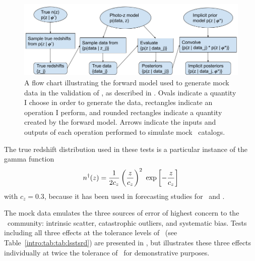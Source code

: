 \begin{figure}
	\begin{center}
		\includegraphics[width=\textwidth]{figures/chippr/flowchart.png}
		\caption{A flow chart illustrating the forward model used to generate mock data in the validation of \Chippr, as described in .
		Ovals indicate a quantity I choose in order to generate the data, rectangles indicate an operation I perform, and rounded rectangles indicate a quantity created by the forward model.
		Arrows indicate the inputs and outputs of each operation performed to simulate mock \pzpdf\ catalogs.}
	\end{center}
\end{figure}

The true redshift distribution used in these tests is a particular instance of the gamma function
\begin{equation}
\eqlabel{eqn:gamma}
n^{\dagger}(z) = \frac{1}{2 c_{z}} \left(\frac{z}{c_{z}}\right)^{2}\ \exp\left[-\frac{z}{c_{z}}\right]
\end{equation}
with $c_{z} = 0.3$, because it has been used in forecasting studies for \des\ and \lsst.

The mock data emulates the three sources of error of highest concern to the \pz\ community: intrinsic scatter, catastrophic outliers, and systematic bias.
Tests including all three effects at the tolerance levels of \lsst\ (see Table~\ref{intro:tab:tab:lsstsrd}) are presented in , but  illustrates these three effects individually at twice the tolerance of \lsst\ for demonstrative purposes.

